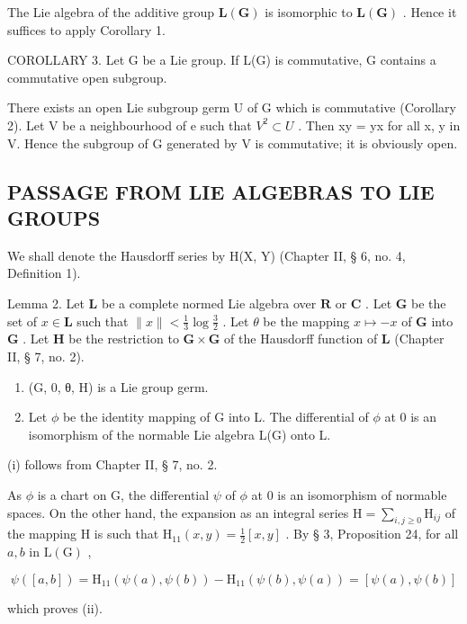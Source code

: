 The Lie algebra of the additive group \(\mathbf{L}(\mathbf{G})\) is isomorphic to \(\mathbf{L}(\mathbf{G})\) . Hence it suffices to apply Corollary 1.

COROLLARY 3. Let G be a Lie group. If L(G) is commutative, G contains a commutative open subgroup.

There exists an open Lie subgroup germ U of G which is commutative (Corollary 2). Let V be a neighbourhood of e such that \(V^{2} \subset U\) . Then xy = yx for all x, y in V. Hence the subgroup of G generated by V is commutative; it is obviously open.

\subsection{PASSAGE FROM LIE ALGEBRAS TO LIE GROUPS}

We shall denote the Hausdorff series by H(X, Y) (Chapter II, § 6, no. 4, Definition 1).

Lemma 2. Let \(\mathbf{L}\) be a complete normed Lie algebra over \(\mathbf{R}\) or \(\mathbf{C}\) . Let \(\mathbf{G}\) be the set of \(x \in \mathbf{L}\) such that \(\| x \| < \frac{1}{3} \log \frac{3}{2}\) . Let \(\theta\) be the mapping \(x \mapsto -x\) of \(\mathbf{G}\) into \(\mathbf{G}\) . Let \(\mathbf{H}\) be the restriction to \(\mathbf{G} \times \mathbf{G}\) of the Hausdorff function of \(\mathbf{L}\) (Chapter II, § 7, no. 2).

\begin{enumerate}
\def\labelenumi{(\roman{enumi})}
\item
  (G, 0, θ, H) is a Lie group germ.
\item
  Let \(\phi\) be the identity mapping of G into L. The differential of \(\phi\) at 0 is an isomorphism of the normable Lie algebra L(G) onto L.
\end{enumerate}
(i) follows from Chapter II, § 7, no. 2.

As \(\phi\) is a chart on G, the differential \(\psi\) of \(\phi\) at 0 is an isomorphism of normable spaces. On the other hand, the expansion as an integral series \(\mathrm{H} = \sum_{i,j\geqslant 0}\mathrm{H}_{ij}\) of the mapping H is such that \(\mathrm{H}_{11}(x,y) = \frac{1}{2} [x,y]\) . By § 3, Proposition 24, for all \(a,b\) in \(\mathrm{L}(\mathrm{G})\) ,

\[
\psi ([ a, b ]) = \mathrm{H} _ {1 1} (\psi (a), \psi (b)) - \mathrm{H} _ {1 1} (\psi (b), \psi (a)) = [ \psi (a), \psi (b) ]
\]

which proves (ii).

